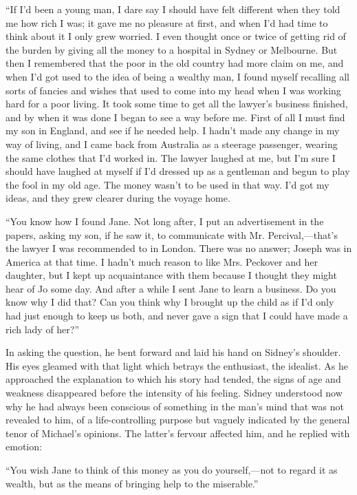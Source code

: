 ``If I'd been a young man, I dare say I should have felt different when
they told me how rich I was; it gave me no pleasure at first, and when
I'd had time to think about it I only grew worried. I even thought once
or twice of getting rid of the burden by giving all the money to a
hospital in Sydney or {}Melbourne. But then I remembered that the poor
in the old country had more claim on me, and when I'd got used to the
idea of being a wealthy man, I found myself recalling all sorts of
fancies and wishes that used to come into my head when I was working
hard for a poor living. It took some time to get all the lawyer's
business finished, and by when it was done I began to see a way before
me. First of all I must find my son in England, and see if he needed
help. I hadn't made any change in my way of living, and I came back from
Australia as a steerage passenger, wearing the same clothes that I'd
worked in. The lawyer laughed at me, but I'm sure I should have laughed
at myself if I'd dressed up as a gentleman and begun to play the fool in
my old age. The money wasn't to be used in that way. I'd got my ideas,
and they grew clearer during the voyage home.

``You know how I found Jane. Not long after, I put an advertisement in
the papers, asking my son, if he saw it, to communicate with Mr.
Percival,---that's the lawyer I was {}recommended to in London. There
was no answer; Joseph was in America at that time. I hadn't much reason
to like Mrs. Peckover and her daughter, but I kept up acquaintance with
them because I thought they might hear of Jo some day. And after a while
I sent Jane to learn a business. Do you know why I did that? Can you
think why I brought up the child as if I'd only had just enough to keep
us both, and never gave a sign that I could have made a rich lady of
her?''

In asking the question, he bent forward and laid his hand on Sidney's
shoulder. His eyes gleamed with that light which betrays the enthusiast,
the idealist. As he approached the explanation to which his story had
tended, the signs of age and weakness disappeared before the intensity
of his feeling. Sidney understood now why he had always been conscious
of something in the man's mind that was not revealed to him, of a
life-controlling purpose but vaguely indicated by the general tenor of
Michael's opinions. The latter's fervour affected him, and he replied
with emotion:

{}``You wish Jane to think of this money as you do yourself,---not to
regard it as wealth, but as the means of bringing help to the
miserable.''

